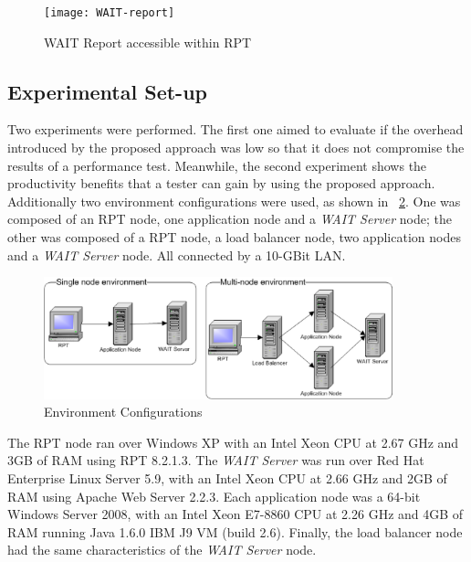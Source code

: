 \documentclass[runningheads,a4paper]{llncs}
\newcommand{\myspaceM}{-7.6pt}
\begin{document}

\begin{figure}[!h]
\centering
\texttt{[image: WAIT-report]}
\caption{WAIT Report accessible within RPT}
\label{fig_report}
\end{figure}

\vspace{\myspaceM{}}
\subsection{Experimental Set-up}
\vspace{\myspaceM{}}
Two experiments were performed. The first one aimed to evaluate if the overhead
introduced by the proposed approach was low so that it does not compromise the
results of a performance test. Meanwhile, the second experiment shows the
productivity benefits that a tester can gain by using the proposed approach.
Additionally two environment configurations were used, as shown in \figurename
~\ref{fig_env}. One was composed of an RPT node, one application node and a
\emph{WAIT Server} node; the other was composed of a RPT node, a load balancer node, 
two application nodes and a \emph{WAIT Server} node. All connected by a 10-GBit
LAN.

\vspace{-1pt}
\begin{figure}[!h]
\centering
\includegraphics[totalheight=.14\textheight,width=0.9\textwidth]{Environments}
\caption{Environment Configurations}
\label{fig_env}
\end{figure}

The RPT node ran over Windows XP with an Intel Xeon CPU at
2.67 GHz and 3GB of RAM using RPT 8.2.1.3. The \emph{WAIT Server} was run over
Red Hat Enterprise Linux Server 5.9, with an Intel Xeon CPU at 2.66 GHz and 2GB of
RAM using Apache Web Server 2.2.3. Each application node was a 64-bit Windows
Server 2008, with an Intel Xeon E7-8860 CPU at 2.26 GHz and 4GB of RAM
running Java 1.6.0 IBM J9 VM (build 2.6). Finally, the load balancer node had
the same characteristics of the \emph{WAIT Server} node. 
\end{document}

